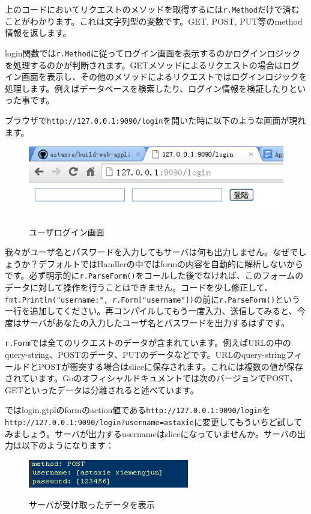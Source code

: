 上のコードにおいてリクエストのメソッドを取得するには\texttt{r.Method}だけで済むことがわかります。これは文字列型の変数です。GET, POST, PUT等のmethod情報を返します。

login関数では\texttt{r.Method}に従ってログイン画面を表示するのかログインロジックを処理するのかが判断されます。GETメソッドによるリクエストの場合はログイン画面を表示し、その他のメソッドによるリクエストではログインロジックを処理します。例えばデータベースを検索したり、ログイン情報を検証したりといった事です。

ブラウザで\texttt{http://127.0.0.1:9090/login}を開いた時に以下のような画面が現れます。

\begin{figure}[H]
  \includegraphics[width=14cm]{4.1.login.png}
   \label{図4.1}
   \caption{ユーザログイン画面}
\end{figure}

我々がユーザ名とパスワードを入力してもサーバは何も出力しません。なぜでしょうか？デフォルトではHandlerの中ではformの内容を自動的に解析しないからです。必ず明示的に\texttt{r.ParseForm()}をコールした後でなければ、このフォームのデータに対して操作を行うことはできません。コードを少し修正して、\texttt{fmt.Println("username:", r.Form["username"])}の前に\texttt{r.ParseForm()}という一行を追加してください。再コンパイルしてもう一度入力、送信してみると、今度はサーバがあなたの入力したユーザ名とパスワードを出力するはずです。

\texttt{r.Form}では全てのリクエストのデータが含まれています。例えばURLの中のquery-string、POSTのデータ、PUTのデータなどです。URLのquery-stringフィールドとPOSTが衝突する場合はsliceに保存されます。これには複数の値が保存されています。Goのオフィシャルドキュメントでは次のバージョンでPOST、GETといったデータは分離されると述べています。

ではlogin.gtplのformのaction値である\texttt{http://127.0.0.1:9090/login}を\texttt{http://127.0.0.1:9090/login?username=astaxie}に変更してもういちど試してみましょう。サーバが出力するusernameはsliceになっていませんか。サーバの出力は以下のようになります：

\begin{figure}[H]
  \includegraphics[width=7cm]{4.1.slice.png}
   \label{図4.1}
   \caption{サーバが受け取ったデータを表示}
\end{figure}


